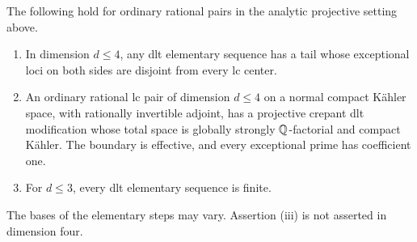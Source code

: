 \begin{theorem}
\label{bir:special-termination}
The following hold for ordinary rational pairs in the analytic
projective setting above.
\begin{enumerate}[label=\textup{(\roman*)}]
\item In dimension $d\leq4$, any dlt elementary sequence has a tail
whose exceptional loci on both sides are disjoint from every lc
center.
\item An ordinary rational lc pair of dimension $d\leq4$ on a
normal compact K\"ahler space, with rationally invertible adjoint,
has a projective crepant dlt modification whose total space is
globally strongly $\mathbb{Q}$-factorial and compact K\"ahler.  The boundary
is effective, and every exceptional prime has coefficient one.
\item For $d\leq3$, every dlt elementary sequence is finite.
\end{enumerate}
The bases of the elementary steps may vary.  Assertion \textup{(iii)}
is not asserted in dimension four.
\end{theorem}


